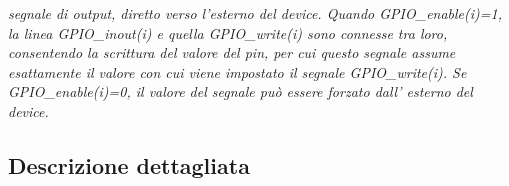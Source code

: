 \begin{DoxyCompactItemize}
\begin{DoxyCompactList}\small\item\em segnale di output, diretto verso l'esterno del device. Quando G\+P\+I\+O\+\_\+enable(i)=1, la linea G\+P\+I\+O\+\_\+inout(i) e quella G\+P\+I\+O\+\_\+write(i) sono connesse tra loro, consentendo la scrittura del valore del pin, per cui questo segnale assume esattamente il valore con cui viene impostato il segnale G\+P\+I\+O\+\_\+write(i). Se G\+P\+I\+O\+\_\+enable(i)=0, il valore del segnale può essere forzato dall' esterno del device. \end{DoxyCompactList}\end{DoxyCompactItemize}


\subsection{Descrizione dettagliata}
